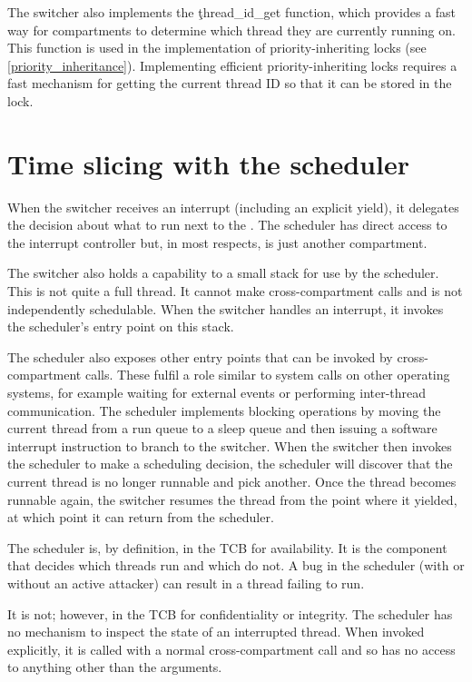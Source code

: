 
The switcher also implements the \c{thread_id_get} function, which provides a fast way for compartments to determine which thread they are currently running on.
This function is used in the implementation of priority-inheriting locks (see \ref{priority_inheritance}).
Implementing efficient priority-inheriting locks requires a fast mechanism for getting the current thread ID so that it can be stored in the lock.


\section{Time slicing with the scheduler}

When the switcher receives an interrupt (including an explicit yield), it delegates the decision about what to run next to the .
The scheduler has direct access to the interrupt controller but, in most respects, is just another compartment.

The switcher also holds a capability to a small stack for use by the scheduler.
This is not quite a full thread.
It cannot make cross-compartment calls and is not independently schedulable.
When the switcher handles an interrupt, it invokes the scheduler's entry point on this stack.

The scheduler also exposes other entry points that can be invoked by cross-compartment calls.
These fulfil a role similar to system calls on other operating systems, for example waiting for external events or performing inter-thread communication.
The scheduler implements blocking operations by moving the current thread from a run queue to a sleep queue and then issuing a software interrupt instruction to branch to the switcher.
When the switcher then invokes the scheduler to make a scheduling decision, the scheduler will discover that the current thread is no longer runnable and pick another.
Once the thread becomes runnable again, the switcher resumes the thread from the point where it yielded, at which point it can return from the scheduler.

The scheduler is, by definition, in the TCB for availability.
It is the component that decides which threads run and which do not.
A bug in the scheduler (with or without an active attacker) can result in a thread failing to run.

It is not; however, in the TCB for confidentiality or integrity.
The scheduler has no mechanism to inspect the state of an interrupted thread.
When invoked explicitly, it is called with a normal cross-compartment call and so has no access to anything other than the arguments.

